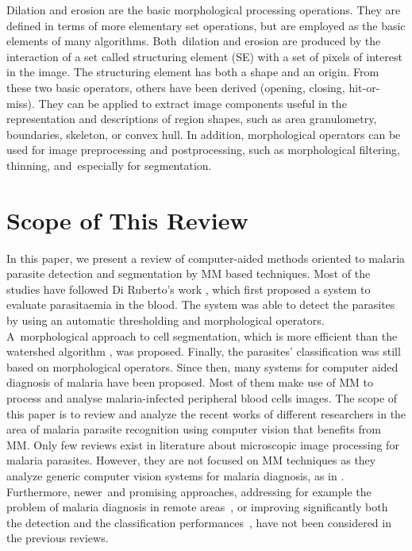 \documentclass[sensors,review,accept,moreauthors,pdftex,10pt,a4paper]{mdpi}
\begin{document}
Dilation and erosion are the basic morphological processing operations. They are defined in terms of more elementary set operations, but are employed as the basic elements of many algorithms. Both~dilation and erosion are produced by the interaction of a set called structuring element (SE) with a set of pixels of interest in the image. The structuring element has both a shape and an origin. From these two basic operators, others have been derived (opening, closing, hit-or-miss). They can be applied to extract image components useful in the representation and descriptions of region shapes, such as area granulometry, boundaries, skeleton, or convex hull. In addition, morphological operators can be used for image preprocessing and postprocessing, such as morphological filtering, thinning, and~especially for segmentation.

\section{Scope of This Review}\label{s2}
In this paper, we present a review of computer-aided methods oriented to malaria parasite detection and segmentation by MM based techniques.
Most of the studies have followed Di Ruberto's work \cite{DiRuberto2002}, which first proposed a system to evaluate parasitaemia in the blood. The system was able to detect the parasites by using an automatic thresholding and morphological operators. A~morphological approach to cell segmentation, which is more efficient than the watershed algorithm \cite{Soille2004}, was proposed. Finally, the parasites' classification was still based on morphological operators. Since then, many systems for computer aided diagnosis of malaria have been proposed. Most of them make use of MM to process and analyse malaria-infected peripheral blood cells images. The scope of this paper is to review and analyze the recent works of different researchers in the area of malaria parasite recognition using computer vision that benefits from MM. Only few reviews exist in literature about microscopic image processing for malaria parasites. However, they are not focused on MM techniques as they analyze generic computer vision systems for malaria diagnosis, as in \cite{Rosado2017,Das2015,Tek2009}. Furthermore, newer~and promising approaches, addressing for example the problem of malaria diagnosis in remote areas~\cite{Rosado2017,Oliveira2017}, or improving significantly both the detection and the classification performances~\cite{Dave2017,Devi2017,Somasekar2017,Sulist2015}, have not been considered in the previous reviews.
\end{document}
